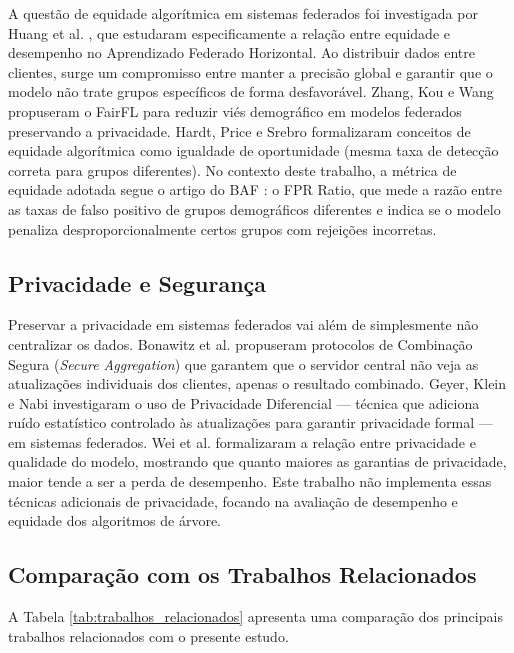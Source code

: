 A questão de equidade algorítmica em sistemas federados foi investigada por Huang et al. \cite{huang2022fairness}, que estudaram especificamente a relação entre equidade e desempenho no Aprendizado Federado Horizontal. Ao distribuir dados entre clientes, surge um compromisso entre manter a precisão global e garantir que o modelo não trate grupos específicos de forma desfavorável. Zhang, Kou e Wang \cite{zhang2020fairfl} propuseram o FairFL para reduzir viés demográfico em modelos federados preservando a privacidade. Hardt, Price e Srebro \cite{hardt2016equality} formalizaram conceitos de equidade algorítmica como igualdade de oportunidade (mesma taxa de detecção correta para grupos diferentes). No contexto deste trabalho, a métrica de equidade adotada segue o artigo do BAF \cite{jesus2022baf}: o FPR Ratio, que mede a razão entre as taxas de falso positivo de grupos demográficos diferentes e indica se o modelo penaliza desproporcionalmente certos grupos com rejeições incorretas.

\subsection{Privacidade e Segurança}

Preservar a privacidade em sistemas federados vai além de simplesmente não centralizar os dados. Bonawitz et al. \cite{bonawitz2017secagg} propuseram protocolos de Combinação Segura (\textit{Secure Aggregation}) que garantem que o servidor central não veja as atualizações individuais dos clientes, apenas o resultado combinado. Geyer, Klein e Nabi \cite{geyer2017differential} investigaram o uso de Privacidade Diferencial --- técnica que adiciona ruído estatístico controlado às atualizações para garantir privacidade formal --- em sistemas federados. Wei et al. \cite{wei2020privacy} formalizaram a relação entre privacidade e qualidade do modelo, mostrando que quanto maiores as garantias de privacidade, maior tende a ser a perda de desempenho. Este trabalho não implementa essas técnicas adicionais de privacidade, focando na avaliação de desempenho e equidade dos algoritmos de árvore.

\subsection{Comparação com os Trabalhos Relacionados}

A Tabela \ref{tab:trabalhos_relacionados} apresenta uma comparação dos principais trabalhos relacionados com o presente estudo.

